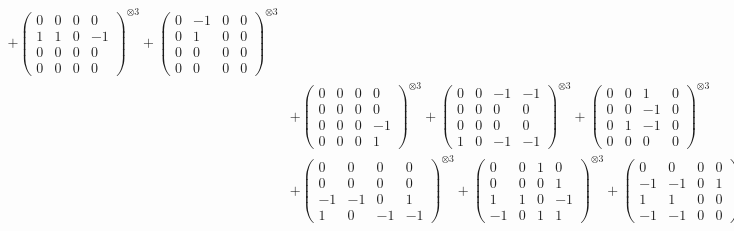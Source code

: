\documentclass{article}
\begin{document}
{\begin{align}
            + \begin{pmatrix} 0 & 0 & 0 & 0 \\ 1 & 1 & 0 & -1 \\ 0 & 0 & 0 & 0 \\ 0 & 0 & 0 & 0 \end{pmatrix}^{\otimes 3} 
            + \begin{pmatrix} 0 & -1 & 0 & 0 \\ 0 & 1 & 0 & 0 \\ 0 & 0 & 0 & 0 \\ 0 & 0 & 0 & 0 \end{pmatrix}^{\otimes 3} \\
        &+ \label{Rs16-Rc11-Solution-18-c10} \begin{pmatrix} 0 & 0 & 0 & 0 \\ 0 & 0 & 0 & 0 \\ 0 & 0 & 0 & -1 \\ 0 & 0 & 0 & 1 \end{pmatrix}^{\otimes 3} 
            + \begin{pmatrix} 0 & 0 & -1 & -1 \\ 0 & 0 & 0 & 0 \\ 0 & 0 & 0 & 0 \\ 1 & 0 & -1 & -1 \end{pmatrix}^{\otimes 3} 
            + \begin{pmatrix} 0 & 0 & 1 & 0 \\ 0 & 0 & -1 & 0 \\ 0 & 1 & -1 & 0 \\ 0 & 0 & 0 & 0 \end{pmatrix}^{\otimes 3} \\
        &+ \label{Rs16-Rc11-Solution-18-c13} \begin{pmatrix} 0 & 0 & 0 & 0 \\ 0 & 0 & 0 & 0 \\ -1 & -1 & 0 & 1 \\ 1 & 0 & -1 & -1 \end{pmatrix}^{\otimes 3} 
            + \begin{pmatrix} 0 & 0 & 1 & 0 \\ 0 & 0 & 0 & 1 \\ 1 & 1 & 0 & -1 \\ -1 & 0 & 1 & 1 \end{pmatrix}^{\otimes 3} 
            + \begin{pmatrix} 0 & 0 & 0 & 0 \\ -1 & -1 & 0 & 1 \\ 1 & 1 & 0 & 0 \\ -1 & -1 & 0 & 0 \end{pmatrix}^{\otimes 3} \\

\end{align}}
\end{document}
